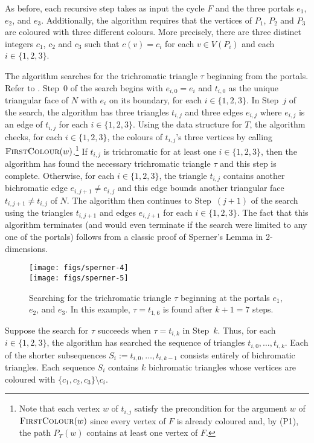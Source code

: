 \documentclass[kpfonts]{patmorin}
\begin{document}
As before, each recursive step takes as input the cycle $F$ and the three portals $e_1$, $e_2$, and $e_3$.  Additionally, the algorithm requires that the vertices of $P_1$, $P_2$ and $P_3$ are coloured with three different colours.  More precisely, there are three distinct integers $c_1$, $c_2$ and $c_3$ such that $c(v)=c_i$ for each $v\in V(P_i)$ and each $i\in\{1,2,3\}$.

 The algorithm searches for the trichromatic triangle $\tau$ beginning from the portals.  Refer to . Step~0 of the search begins with $e_{i,0}=e_i$ and $t_{i,0}$ as the unique triangular face of $N$ with $e_i$ on its boundary, for each $i\in\{1,2,3\}$. In Step~$j$ of the search, the algorithm has three triangles $t_{i,j}$ and three edges $e_{i,j}$ where $e_{i,j}$ is an edge of $t_{i,j}$ for each $i\in\{1,2,3\}$.  Using the data structure for $T$, the algorithm checks, for each $i\in\{1,2,3\}$, the colours of $t_{i,j}$'s three vertices by calling $\textsc{FirstColour}(w)$.\footnote{Note that each vertex $w$ of $t_{i,j}$ satisfy the precondition for the argument $w$ of $\textsc{FirstColour}(w)$ since every vertex of $F$ is already coloured and, by (P1), the path $P_{T}(w)$ contains at least one vertex of $F$.}  If $t_{i,j}$ is trichromatic for at least one $i\in\{1,2,3\}$, then the algorithm has found the necessary trichromatic triangle $\tau$ and this step is complete. Otherwise, for each $i\in\{1,2,3\}$, the triangle $t_{i,j}$ contains another bichromatic edge $e_{i,j+1}\neq e_{i,j}$ and this edge bounds another triangular face $t_{i,j+1}\neq t_{i,j}$ of $N$.  The algorithm then continues to Step~$(j+1)$ of the search using the triangles $t_{i,j+1}$ and edges $e_{i,j+1}$ for each $i\in\{1,2,3\}$.  The fact that this algorithm terminates (and would even terminate if the search were limited to any one of the portals) follows from a classic proof of Sperner's Lemma in 2-dimensions.

 \begin{figure}
   \begin{center}
     \texttt{[image: figs/sperner-4]} \\[1ex]
     \texttt{[image: figs/sperner-5]}
   \end{center}
   \caption{Searching for the trichromatic triangle $\tau$ beginning at the portals $e_1$, $e_2$, and $e_3$. In this example, $\tau=t_{1,6}$ is found after $k+1=7$ steps.}
 \end{figure}


Suppose the search for $\tau$ succeeds when $\tau=t_{i,k}$ in Step~$k$.  Thus, for each $i\in\{1,2,3\}$, the algorithm has searched the sequence of triangles $t_{i,0},\ldots,t_{i,k}$.  Each of the shorter subsequences $S_i:=t_{i,0},\ldots,t_{i,k-1}$ consists entirely of bichromatic triangles. Each sequence $S_i$ contains $k$ bichromatic triangles whose vertices are coloured with $\{c_1,c_2,c_3\}\setminus c_i$.
\end{document}
